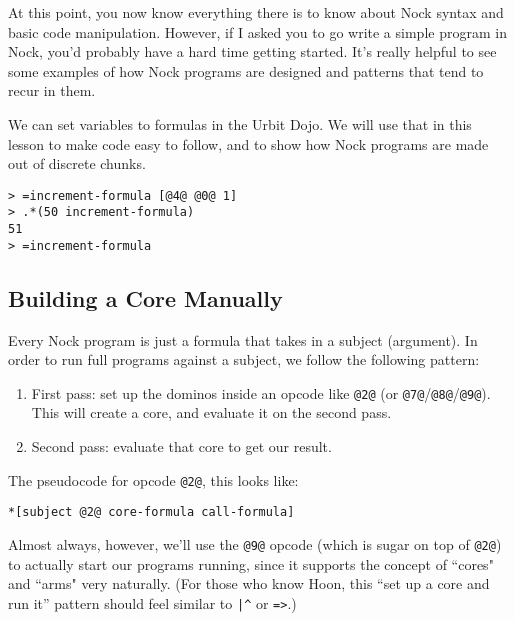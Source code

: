 \documentclass[twoside]{article}
\begin{document}
At this point, you now know everything there is to know about Nock syntax and basic code manipulation.  However, if I asked you to go write a simple program in Nock, you'd probably have a hard time getting started. It's really helpful to see some examples of how Nock programs are designed and patterns that tend to recur in them.

We can set variables to formulas in the Urbit Dojo. We will use that in this lesson to make code easy to follow, and to show how Nock programs are made out of discrete chunks.

\begin{lstlisting}[style=listingblock]
> =increment-formula [@4@ @0@ 1]
> .*(50 increment-formula)
51
> =increment-formula
\end{lstlisting}

\subsection{Building a Core Manually}

Every Nock program is just a formula that takes in a subject (argument). In order to run full programs against a subject, we follow the following pattern:

\begin{enumerate}
  \item  First pass:  set up the dominos inside an opcode like \lstinline[style=inlinecode]{@2@} (or \lstinline[style=inlinecode]{@7@}/\lstinline[style=inlinecode]{@8@}/\lstinline[style=inlinecode]{@9@}). This will create a core, and evaluate it on the second pass.
  \item  Second pass:  evaluate that core to get our result.
\end{enumerate}

The pseudocode for opcode \lstinline[style=inlinecode]{@2@}, this looks like:

\begin{lstlisting}[style=listingcode]
*[subject @2@ core-formula call-formula]
\end{lstlisting}

Almost always, however, we'll use the \lstinline[style=inlinecode]{@9@} opcode (which is sugar on top of \lstinline[style=inlinecode]{@2@}) to actually start our programs running, since it supports the concept of ``cores" and ``arms" very naturally.  (For those who know Hoon, this “set up a core and run it” pattern should feel similar to \lstinline[style=inlinecode]{|^} or \lstinline[style=inlinecode]{=>}.)
\end{document}

